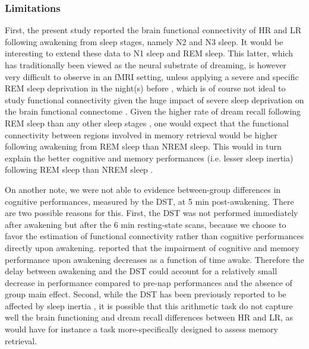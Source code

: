 \subsubsection{Limitations}
First, the present study reported the brain functional connectivity of HR and LR following awakening from sleep stages, namely N2 and N3 sleep. It would be interesting to extend these data to N1 sleep and REM sleep. This latter, which has traditionally been viewed as the neural substrate of dreaming, is however very difficult to observe in an fMRI setting, unless applying a severe and specific REM sleep deprivation in the night(s) before \citep{duyn_eeg-fmri_2012}, which is of course not ideal to study functional connectivity given the huge impact of severe sleep deprivation on the brain functional connectome \citep{de_havas_sleep_2012, yeo_functional_2015, krause_sleep-deprived_2017}. Given the higher rate of dream recall following REM sleep than any other sleep stages \citep{nielsen_review_2000, ruby_experimental_2011}, one would expect that the functional connectivity between regions involved in memory retrieval would be higher following awakening from REM sleep than NREM sleep. This would in turn explain the better cognitive and memory performances (i.e. lesser sleep inertia) following REM sleep than NREM sleep \citep{bonnet_memory_1983, koukkou_dreaming:_1983, conduit_poor_2004}.

On another note, we were not able to evidence between-group differences in cognitive performances, measured by the DST, at 5 min post-awakening. There are two possible reasons for this. First, the DST was not performed immediately after awakening but after the 6 min resting-state scans, because we choose to favor the estimation of functional connectivity rather than cognitive performances directly upon awakening. \citet{bonnet_memory_1983} reported that the impairment of cognitive and memory performance upon awakening decreases as a function of time awake. Therefore the delay between awakening and the DST could account for a relatively small decrease in performance compared to pre-nap performances and the absence of group main effect. Second, while the DST has been previously reported to be affected by sleep inertia \citep{dinges_assessing_1985}, it is possible that this arithmetic task do not capture well the brain functioning and dream recall differences between HR and LR, as would have for instance a task more-specifically designed to assess memory retrieval.

